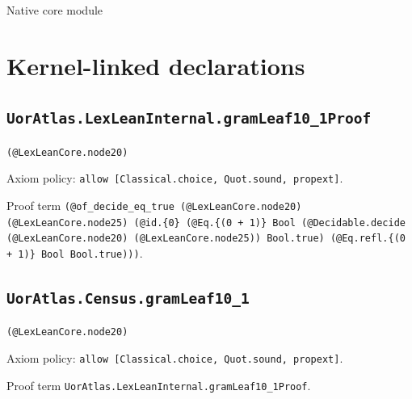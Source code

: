 \documentclass[11pt]{article}
\begin{document}
\begin{center}{\LARGE Native core module}\end{center}
\section*{Kernel-linked declarations}
\subsection*{\texttt{UorAtlas.LexLeanInternal.gramLeaf10\_1Proof}}
\noindent\texttt{(@LexLeanCore.node20)}\par
\noindent Axiom policy: \texttt{allow [Classical.choice, Quot.sound, propext]}.\par
\noindent Proof term \texttt{(@of\_decide\_eq\_true (@LexLeanCore.node20) (@LexLeanCore.node25) (@id.\{0\} (@Eq.\{(0 + 1)\} Bool (@Decidable.decide (@LexLeanCore.node20) (@LexLeanCore.node25)) Bool.true) (@Eq.refl.\{(0 + 1)\} Bool Bool.true)))}.\par
\subsection*{\texttt{UorAtlas.Census.gramLeaf10\_1}}
\noindent\texttt{(@LexLeanCore.node20)}\par
\noindent Axiom policy: \texttt{allow [Classical.choice, Quot.sound, propext]}.\par
\noindent Proof term \texttt{UorAtlas.LexLeanInternal.gramLeaf10\_1Proof}.\par
\end{document}
